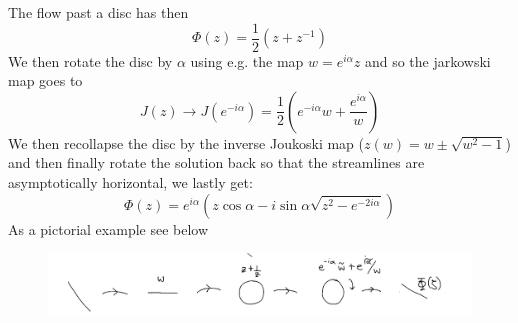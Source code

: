 \documentclass[a4paper,12pt]{article}
\begin{document}
The flow past a disc has then
\begin{equation}
\Phi(z)=\frac{1}{2}\left(z+z^{-1}\right)
\end{equation}
 We then rotate the disc by $\alpha$ using e.g. the map $w=e^{i\alpha}z$
 and so the jarkowski map goes to
 \begin{equation}
J(z)\to J(e^{-i\alpha})=\frac{1}{2}\left(e^{-i\alpha}w+\frac{e^{i\alpha}}{w}\right)
 \end{equation}
We then recollapse the disc by the inverse Joukoski map ($z(w)=w\pm\sqrt{w^2-1}$) and then finally rotate the solution back so that the streamlines are asymptotically horizontal, we lastly get:
\begin{equation}
\Phi(z)=e^{i\alpha}\left(z\cos \alpha -i\sin \alpha \sqrt{z^2-e^{-2i\alpha}}\right)
\end{equation}
As a pictorial example see below
\begin{figure}[H]
	\centering
	\includegraphics[width=0.9\linewidth]{11}
	\caption{}
	\label{fig:4}
\end{figure}
\end{document}
